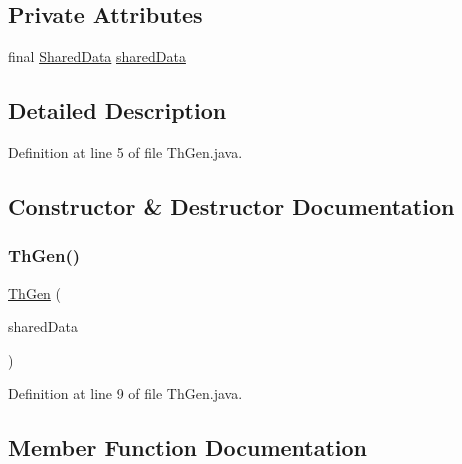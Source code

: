 \subsection*{Private Attributes}
\begin{DoxyCompactItemize}
\item 
final \mbox{\hyperlink{classmain_1_1_shared_data}{Shared\+Data}} \mbox{\hyperlink{classmain_1_1_th_gen_ac5f1128ef8d0ba91a8214e03732e2662}{shared\+Data}}
\end{DoxyCompactItemize}


\subsection{Detailed Description}


Definition at line 5 of file Th\+Gen.\+java.



\subsection{Constructor \& Destructor Documentation}
\mbox{\label{classmain_1_1_th_gen_ab975ff8819d4ba6b00d6661950d14bb6}} 
\subsubsection{\texorpdfstring{Th\+Gen()}{ThGen()}}
{\footnotesize\ttfamily \mbox{\hyperlink{classmain_1_1_th_gen}{Th\+Gen}} (\begin{DoxyParamCaption}\item[{\mbox{\hyperlink{classmain_1_1_shared_data}{Shared\+Data}}}]{shared\+Data }\end{DoxyParamCaption})}



Definition at line 9 of file Th\+Gen.\+java.



\subsection{Member Function Documentation}
\mbox{\label{classmain_1_1_th_gen_a13a43e6d814de94978c515cb084873b1}} 
